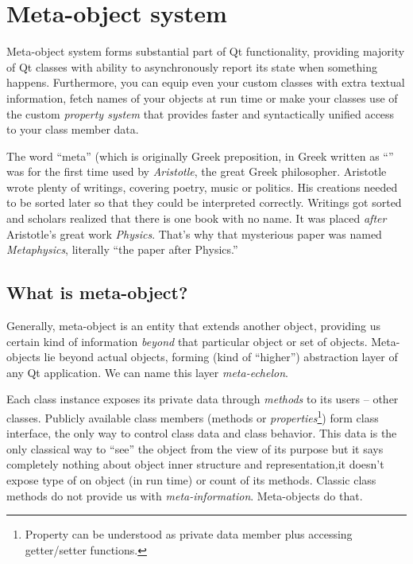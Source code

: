 \section{Meta-object system}
Meta-object system forms substantial part of Qt functionality, providing majority of Qt classes with ability to asynchronously report its state when something happens. Furthermore, you can equip even your custom classes with extra textual information, fetch names of your objects at run time or make your classes use of the custom \textit{property system} that provides faster and syntactically unified access to your class member data.

\begin{fdocextra}
The word \enquote{meta} (which is originally Greek preposition, in Greek written as \enquote{\textmu \textepsilon \texttau \textalpha} was for the first time used by \textit{Aristotle}, the great Greek philosopher. Aristotle wrote plenty of writings, covering poetry, music or politics. His creations needed to be sorted later so that they could be interpreted correctly. Writings got sorted and scholars realized that there is one book with no name. It was placed \textit{after} Aristotle's great work \textit{Physics}. That's why that mysterious paper was named \textit{Metaphysics}, literally \enquote{the paper after Physics.}
\end{fdocextra}

\subsection{What is meta-object?}
Generally, meta-object is an entity that extends another object, providing us certain kind of information \textit{beyond} that particular object or set of objects. Meta-objects lie beyond actual objects, forming (kind of \enquote{higher}) abstraction layer of any Qt application. We can name this layer \textit{meta-echelon}.

Each class instance exposes its private data through \textit{methods} to its users -- other classes. Publicly available class members (methods or \textit{properties}\footnote{Property can be understood as private data member plus accessing getter/setter functions.}) form class interface, the only way to control class data and class behavior. This data is the only classical way to \enquote{see} the object from the view of its purpose but it says completely nothing about object inner structure and representation,\eg it doesn't expose type of on object (in run time) or count of its methods. Classic class methods do not provide us with \textit{meta-information}. Meta-objects do that.

